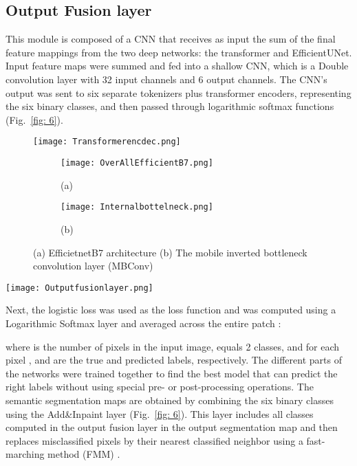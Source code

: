 \documentclass[journal]{IEEEtran}
\begin{document}
\subsection{Output Fusion layer} 
This module is composed of a CNN that receives as input the sum of the final feature mappings from the two deep networks: the transformer and EfficientUNet. Input feature maps were summed and fed into a shallow CNN, which is a Double convolution layer with 32 input channels and 6 output channels.  The CNN’s output was sent to six separate tokenizers plus transformer encoders, representing the six binary classes, and then passed through logarithmic softmax functions (Fig.~\ref{fig: 6}).  
\begin{figure}  
\centering
\texttt{[image: Transformerencdec.png]}
\label{fig: 4}
\end{figure}
\begin{figure}[hptb]
\begin{subfigure}{.18\textwidth}
   \texttt{[image: OverAllEfficientB7.png]}
   \caption{(a)}
\label{fig:g1}
\end{subfigure}\hfill
\begin{subfigure}{.27\textwidth}
   \texttt{[image: Internalbottelneck.png]}
   \caption{(b)}
\label{fig:g2}
\end{subfigure}
\caption{(a) EfficietnetB7 architecture (b) The mobile inverted bottleneck convolution layer (MBConv)}
\label{fig: 5}
\end{figure}
\begin{figure*}  
\centering
\texttt{[image: Outputfusionlayer.png]}
\label{fig: 6}
\end{figure*}
Next, the logistic loss was used as the loss function and was computed using a Logarithmic Softmax layer and averaged across the entire patch \cite{AUDEBERT201820}:


where  is the number of pixels in the input image,  equals 2 classes, and for each pixel  ,   and   are the true and predicted labels, respectively. The different parts of the networks were trained together to find the best model that can predict the right labels without using special pre- or post-processing operations. 
The semantic segmentation maps are obtained by combining the six binary classes using the Add\&Inpaint layer (Fig.~\ref{fig: 6}). This layer includes all classes computed in the output fusion layer in the output segmentation map and then replaces misclassified pixels by their nearest classified neighbor using a fast-marching method (FMM) \cite{doi:10.1080/10867651.2004.10487596}. 
\end{document}
